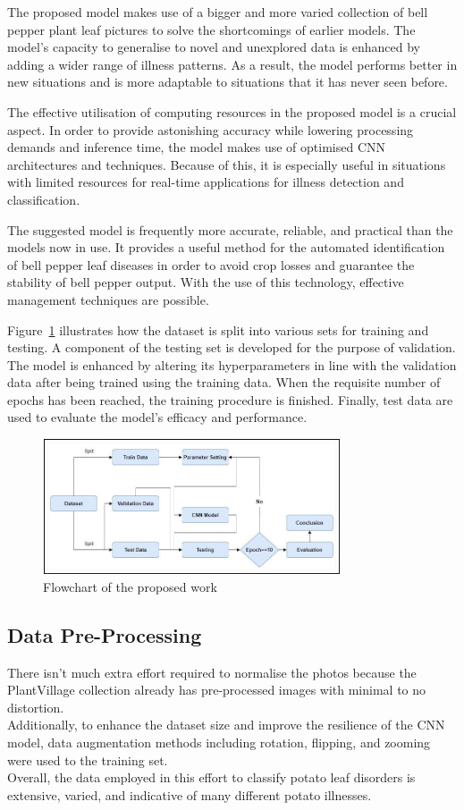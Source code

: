 \documentclass[conference]{IEEEtran}
\begin{document}
The proposed model makes use of a bigger and more varied collection of bell pepper plant leaf pictures to solve the shortcomings of earlier models. The model's capacity to generalise to novel and unexplored data is enhanced by adding a wider range of illness patterns. As a result, the model performs better in new situations and is more adaptable to situations that it has never seen before.

The effective utilisation of computing resources in the proposed model is a crucial aspect. In order to provide astonishing accuracy while lowering processing demands and inference time, the model makes use of optimised CNN architectures and techniques. Because of this, it is especially useful in situations with limited resources for real-time applications for illness detection and classification.

The suggested model is frequently more accurate, reliable, and practical than the models now in use. It provides a useful method for the automated identification of bell pepper leaf diseases in order to avoid crop losses and guarantee the stability of bell pepper output. With the use of this technology, effective management techniques are possible.

Figure~\ref{fig: Figure 1} illustrates how the dataset is split into various sets for training and testing. A component of the testing set is developed for the purpose of validation. The model is enhanced by altering its hyperparameters in line with the validation data after being trained using the training data. When the requisite number of epochs has been reached, the training procedure is finished. Finally, test data are used to evaluate the model's efficacy and performance.


\begin{figure}[H]
 \includegraphics[width=8.8cm, height=4cm]{Tomato Final Flowchart.jpg}
\caption{Flowchart of the proposed work}
\label{fig: Figure 1}
\end{figure}

\subsection{Data Pre-Processing}
There isn't much extra effort required to normalise the photos because the PlantVillage collection already has pre-processed images with minimal to no distortion.\\
Additionally, to enhance the dataset size and improve the resilience of the CNN model, data augmentation methods including rotation, flipping, and zooming were used to the training set.\\
Overall, the data employed in this effort to classify potato leaf disorders is extensive, varied, and indicative of many different potato illnesses.
\end{document}
